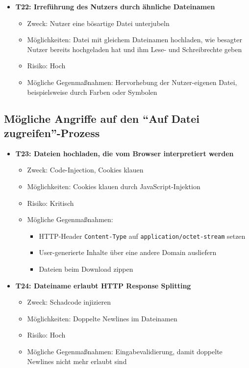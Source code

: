 \documentclass[12pt,DIV14,BCOR10mm,a4paper,parskip=half-,headsepline,headinclude,english,ngerman,bibliography=totocnumbered]{scrreprt}
\begin{document}
\begin{itemize}
  \hypertarget{threat22}{}
  \item \textbf{T22: Irreführung des Nutzers durch ähnliche Dateinamen}
  \begin{itemize}
  \item Zweck: Nutzer eine bösartige Datei unterjubeln
  \item Möglichkeiten: Datei mit gleichem Dateinamen hochladen, wie besagter Nutzer bereits hochgeladen hat und ihm Lese- und Schreibrechte geben
  \item Risiko: Hoch
  \item Mögliche Gegenmaßnahmen: Hervorhebung der Nutzer-eigenen Datei, beispielsweise durch Farben oder Symbolen
  \end{itemize}
\end{itemize}

\subsection{Mögliche Angriffe auf den \enquote{Auf Datei zugreifen}-Prozess}

\begin{itemize}
  \hypertarget{threat23}{}
  \item \textbf{T23: Dateien hochladen, die vom Browser interpretiert werden}
  \begin{itemize}
  \item Zweck: Code-Injection, Cookies klauen
  \item Möglichkeiten: Cookies klauen durch JavaScript-Injektion
  \item Risiko: Kritisch
  \item Mögliche Gegenmaßnahmen:
    \begin{itemize}
      \item HTTP-Header \texttt{Content-Type} auf \texttt{application/octet-stream} setzen
      \item User-generierte Inhalte über eine andere Domain ausliefern
      \item Dateien beim Download zippen
    \end{itemize}
  \end{itemize}

  \hypertarget{threat24}{}
  \item \textbf{T24: Dateiname erlaubt HTTP Response Splitting}
  \begin{itemize}
  \item Zweck: Schadcode injizieren
  \item Möglichkeiten: Doppelte Newlines im Dateinamen
  \item Risiko: Hoch
  \item Mögliche Gegenmaßnahmen: Eingabevalidierung, damit doppelte Newlines nicht mehr erlaubt sind
  \end{itemize}
\end{itemize}
\end{document}
